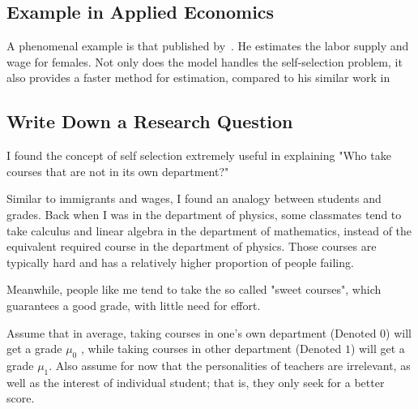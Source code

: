 \subsection{Example in Applied Economics}

A phenomenal example is that published by~\cite{Heckman76}. 
He estimates the labor supply and wage for females. 
Not only does the model handles the self-selection problem, it also provides 
a faster method for estimation, compared to his similar work in 
\citep[see][]{Heckman74}  



\subsection{Write Down a Research Question}

I found the concept of self selection extremely useful in explaining 
"Who take courses that are not in its own department?"

Similar to immigrants and wages, I found an analogy between students and grades.
Back when I was in the department of physics, some classmates tend to take
calculus and linear algebra in the department of mathematics, instead of the
equivalent required course in the department of physics. Those courses are typically
hard and has a relatively higher proportion of people failing. 

Meanwhile, people like me tend to take the so called "sweet courses", which 
guarantees a good grade, with little need for effort.

Assume that in average, taking courses in one's own department (Denoted $0$) will get a grade $\mu_0$
, while taking courses in other department (Denoted $1$) will get a grade $\mu_1$.
Also assume for now that the personalities of teachers are irrelevant, as well as the interest of individual student; 
that is, they only seek for a better score.


